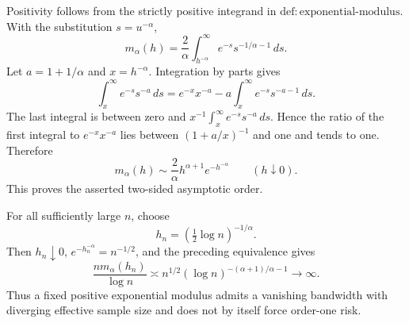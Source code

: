 Positivity follows from the strictly positive integrand in \(\mathrm{def:exponential\text{-}modulus}\). With the substitution \(s=u^{-\alpha}\),
\[
 m_\alpha(h)=\frac2\alpha\int_{h^{-\alpha}}^\infty e^{-s}s^{-1/\alpha-1}\,ds.
\]
Let \(a=1+1/\alpha\) and \(x=h^{-\alpha}\). Integration by parts gives
\[
 \int_x^\infty e^{-s}s^{-a}\,ds
 =e^{-x}x^{-a}-a\int_x^\infty e^{-s}s^{-a-1}\,ds.
\]
The last integral is between zero and \(x^{-1}\int_x^\infty e^{-s}s^{-a}\,ds\). Hence the ratio of the first integral to \(e^{-x}x^{-a}\) lies between \((1+a/x)^{-1}\) and one and tends to one. Therefore
\[
 m_\alpha(h)\sim\frac2\alpha h^{\alpha+1}e^{-h^{-\alpha}}
 \qquad(h\downarrow0).
\]
This proves the asserted two-sided asymptotic order.

For all sufficiently large \(n\), choose
\[
 h_n=\left(\tfrac12\log n\right)^{-1/\alpha}.
\]
Then \(h_n\downarrow0\), \(e^{-h_n^{-\alpha}}=n^{-1/2}\), and the preceding equivalence gives
\[
 \frac{n m_\alpha(h_n)}{\log n}
 \asymp n^{1/2}(\log n)^{-(\alpha+1)/\alpha-1}\longrightarrow\infty.
\]
Thus a fixed positive exponential modulus admits a vanishing bandwidth with diverging effective sample size and does not by itself force order-one risk.